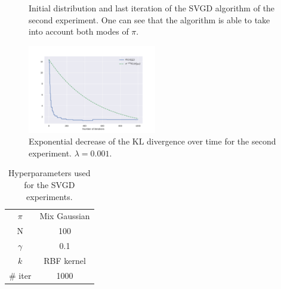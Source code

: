 \documentclass{article}
\newcommand{\KL}{\mathrm{KL}}
\begin{document}
\begin{figure}[H]
  \caption{Initial distribution and last iteration of the SVGD algorithm
    of the second experiment. One can see that the
    algorithm is able to take into account both modes of $\pi$.}
  \label{fig:exp2}
\end{figure}

\begin{figure}[H]
  \centering
  \includegraphics[width=0.5\textwidth]{exp2-KL.pdf}
  \caption{Exponential decrease of the $\KL$ divergence
    over time for the second experiment. $\lambda=0.001$.}
  \label{fig:KL-exp2}
\end{figure}

\begin{table}[H]
  \centering
  \begin{tabular}{c|c}
    \hline
    $\pi$ & Mix Gaussian \\
    N & 100 \\
    $\gamma$ & 0.1 \\
    $k$ & RBF kernel \\
    \# iter & 1000 \\
    \hline
  \end{tabular}
  \caption{Hyperparameters used for the SVGD experiments.}
  \label{tab:hyperparameters}
\end{table}
\end{document}
